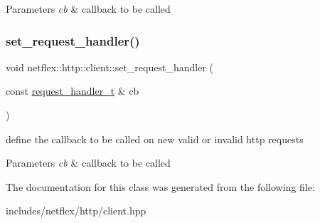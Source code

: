 \begin{DoxyParams}{Parameters}
{\em cb} & callback to be called \\
\hline
\end{DoxyParams}
\mbox{\label{classnetflex_1_1http_1_1client_a02ca4f8b6c166321e122fbb806b23ae2}} 
\subsubsection{\texorpdfstring{set\+\_\+request\+\_\+handler()}{set\_request\_handler()}}
{\footnotesize\ttfamily void netflex\+::http\+::client\+::set\+\_\+request\+\_\+handler (\begin{DoxyParamCaption}\item[{const \hyperlink{classnetflex_1_1http_1_1client_aeac22a78222d25d3224bf50b8e44fb2d}{request\+\_\+handler\+\_\+t} \&}]{cb }\end{DoxyParamCaption})}

define the callback to be called on new valid or invalid http requests


\begin{DoxyParams}{Parameters}
{\em cb} & callback to be called \\
\hline
\end{DoxyParams}


The documentation for this class was generated from the following file\+:\begin{DoxyCompactItemize}
\item 
includes/netflex/http/client.\+hpp\end{DoxyCompactItemize}

